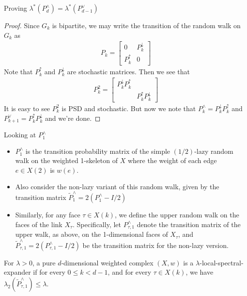 \documentclass[10pt]{beamer}
\begin{document}
\begin{frame}{Proving $\lambda^*(P_d^{\wedge})  = \lambda^*(P_{d-1}^{\vee})$}
    \begin{proof}
        Since $G_k$ is bipartite, we may write the transition of the random walk on $G_k$ as \begin{align*}
            P_k = \begin{bmatrix}
                0  & P_k^{\downarrow} \\
                P_k^{\uparrow} & 0
            \end{bmatrix}
        \end{align*}
        Note that $P_k^{\uparrow}$ and $P_k^{\downarrow}$ are stochastic matrices. Then we see that \begin{align*}
            P_k^2 = \begin{bmatrix}
                P_k^{\downarrow}P_k^{\uparrow}  &  \\
                &  P_k^{\uparrow}P_k^{\downarrow}
            \end{bmatrix}
        \end{align*}
        It is easy to see $P_k^2$ is PSD and stochastic. But now we note that $P_k^\wedge =  P_k^{\downarrow}P_k^{\uparrow}$ and $P_{k+1}^\vee = P_k^{\uparrow}P_k^{\downarrow}$ and we're done.  
    \end{proof}
\end{frame}

\begin{frame}{Looking at $P^\wedge_1$}
    \begin{itemize}
        \item  \( P^{\wedge}_1 \) is the transition probability matrix of the simple \((1/2)\)-lazy random walk on the weighted 1-skeleton of \( X \) where the weight of each edge \( e \in X(2) \) is \( w(e) \).
        \item Also consider the non-lazy variant of this random walk, given by the transition matrix \( \widetilde{P}^{\wedge}_1= 2(P^{\wedge}_1 - I/2) \)
        \item Similarly, for any face \( \tau \in X(k) \), we define the upper random walk on the faces of the link \( X_{\tau} \). Specifically, let \( P^{\wedge}_{\tau,1} \) denote the transition matrix of the upper walk, as above, on the 1-dimensional faces of \( X_{\tau} \), and \( \widetilde{P}^{\wedge}_{\tau, 1} = 2(P^{\wedge}_{\tau, 1} - I/2) \) be the transition matrix for the non-lazy version.
    \end{itemize}
     
    \begin{definition}
          For \( \lambda > 0 \), a pure \( d \)-dimensional weighted complex \( (X, w) \) is a \( \lambda \)-local-spectral-expander if for every \( 0 \leq k < d - 1 \), and for every \( \tau \in X(k) \), we have \( \lambda_2(\widetilde{P}^{\wedge}_{\tau, 1}) \leq \lambda \).
    \end{definition}
\end{frame}
\end{document}

